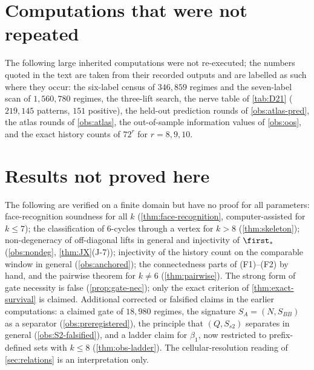 \section{Computations that were not repeated}
The following large inherited computations were not re-executed; the numbers quoted in the text are taken from their recorded outputs and are labelled as such where they occur: the six-label census of $346{,}859$ regimes and the seven-label scan of $1{,}560{,}780$ regimes, the three-lift search, the nerve table of \cref{tab:D21} ($219{,}145$ patterns, $151$ positive), the held-out prediction rounds of \cref{obs:atlas-pred}, the atlas rounds of \cref{obs:atlas}, the out-of-sample information values of \cref{obs:oos}, and the exact history counts of $72^r$ for $r=8,9,10$.

\section{Results not proved here}
The following are verified on a finite domain but have no proof for all parameters: face-recognition soundness for all $k$ (\cref{thm:face-recognition}, computer-assisted for $k\le7$); the classification of $6$-cycles through a vertex for $k>8$ (\cref{thm:skeleton}); non-degeneracy of off-diagonal lifts in general and injectivity of $\first_\ast$ (\cref{obs:nondeg}, \cref{thm:JX}(J-7)); injectivity of the history count on the comparable window in general (\cref{obs:anchored}); the connectedness parts of (F1)--(F2) by hand, and the pairwise theorem for $k\ne6$ (\cref{thm:pairwise}). The strong form of gate necessity is false (\cref{prop:gate-nec}); only the exact criterion of \cref{thm:exact-survival} is claimed. Additional corrected or falsified claims in the earlier computations: a claimed gate of $18{,}980$ regimes, the signature $S_A=(N,S_{BB})$ as a separator (\cref{obs:preregistered}), the principle that $(Q,S_{s2})$ separates in general (\cref{obs:S2-falsified}), and a ladder claim for $\beta_1$, now restricted to prefix-defined sets with $k\le8$ (\cref{thm:obs-ladder}). The cellular-resolution reading of \cref{sec:relations} is an interpretation only.

